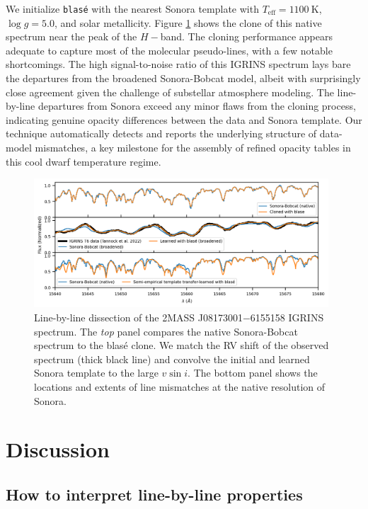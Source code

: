 \documentclass[twocolumn]{aastex631}
\begin{document}
We initialize \texttt{blas\'e} with the nearest Sonora template with $T_\mathrm{eff} = 1100~\text{K}$, $\log{g}=5.0$, and solar metallicity.  Figure \ref{fig_IGRINS_sonora_demo} shows the clone of this native spectrum near the peak of the $H-$band. The cloning performance appears adequate to capture most of the molecular pseudo-lines, with a few notable shortcomings. The high signal-to-noise ratio of this IGRINS spectrum lays bare the departures from the broadened Sonora-Bobcat model, albeit with surprisingly close agreement given the challenge of substellar atmosphere modeling.  The line-by-line departures from Sonora exceed any minor flaws from the cloning process, indicating genuine opacity differences between the data and Sonora template.  Our technique automatically detects and reports the underlying structure of data-model mismatches, a key milestone for the assembly of refined opacity tables in this cool dwarf temperature regime.

\begin{figure}[hbt!]
    \centering
    \includegraphics[width=0.98\textwidth]{figures/IGRINS_T6_sonora_demo.png}
    \caption{Line-by-line dissection of the 2MASS J08173001$-$6155158 IGRINS spectrum.  The \emph{top} panel compares the native Sonora-Bobcat spectrum to the blas\'e clone.  We match the RV shift of the observed spectrum (thick black line) and convolve the initial and learned Sonora template to the large $v\sin{i}$.  The bottom panel shows the locations and extents of line mismatches at the native resolution of Sonora.}
    \label{fig_IGRINS_sonora_demo}
\end{figure}


\section{Discussion}\label{secDiscuss}

\subsection{How to interpret line-by-line properties}
\end{document}
